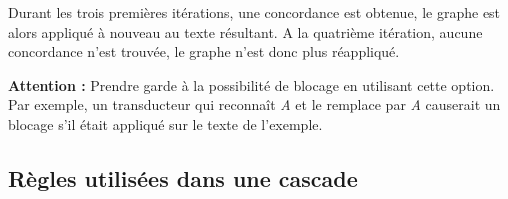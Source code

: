 \bigskip
Durant les trois premières itérations, une concordance est obtenue, le graphe
est alors appliqué à nouveau au texte résultant. A la quatrième itération, aucune
concordance n'est trouvée, le graphe n'est donc plus réappliqué.

\bigskip
\large{\textbf{Attention :}} Prendre garde à la possibilité de blocage en utilisant cette 
option. Par exemple, un transducteur qui reconnaît \emph{A} et le remplace par
\emph{A} causerait un blocage s'il était appliqué sur le texte de l'exemple.

\subsection{Règles utilisées dans une cascade}

